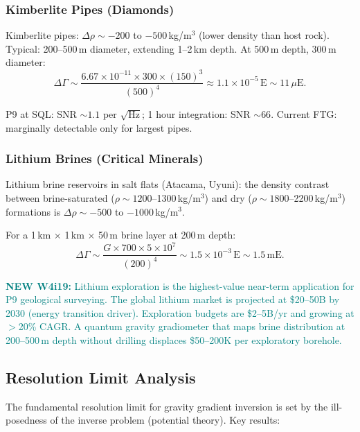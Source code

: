 \documentclass[11pt]{article}
\theoremstyle{definition}
\theoremstyle{remark}
\newcommand{\ee}[1]{\times10^{#1}}
\newcommand{\newfinding}[1]{\textcolor{teal}{\textbf{NEW W4i19:} #1}}
\begin{document}
\subsubsection{Kimberlite Pipes (Diamonds)}

Kimberlite pipes: $\Delta\rho \sim -200$ to $-500$\,kg/m$^3$ (lower density
than host rock). Typical: 200--500\,m diameter, extending 1--2\,km depth.
At 500\,m depth, 300\,m diameter:
\begin{equation}
  \Delta\Gamma \sim \frac{6.67\ee{-11} \times 300 \times (150)^3}{(500)^4}
  \approx 1.1\ee{-5}\,\text{E} \sim 11\,\mu\text{E}.
\end{equation}

P9 at SQL: SNR $\sim 1.1$ per $\sqrt{\text{Hz}}$; 1 hour integration: SNR $\sim 66$.
Current FTG: marginally detectable only for largest pipes.

\subsubsection{Lithium Brines (Critical Minerals)}

Lithium brine reservoirs in salt flats (Atacama, Uyuni): the density
contrast between brine-saturated ($\rho \sim 1200$--1300\,kg/m$^3$) and
dry ($\rho \sim 1800$--2200\,kg/m$^3$) formations is $\Delta\rho \sim
-500$ to $-1000$\,kg/m$^3$.

For a 1\,km $\times$ 1\,km $\times$ 50\,m brine layer at 200\,m depth:
\begin{equation}
  \Delta\Gamma \sim \frac{G \times 700 \times 5\ee{7}}{(200)^4}
  \sim 1.5\ee{-3}\,\text{E} \sim 1.5\,\text{mE}.
\end{equation}

\newfinding{Lithium exploration is the highest-value near-term application
for P9 geological surveying. The global lithium market is projected at
\$20--50B by 2030 (energy transition driver). Exploration budgets are
\$2--5B/yr and growing at $>$20\% CAGR. A quantum gravity gradiometer
that maps brine distribution at 200--500\,m depth without drilling
displaces \$50--200K per exploratory borehole.}

\subsection{Resolution Limit Analysis}

The fundamental resolution limit for gravity gradient inversion is set by
the ill-posedness of the inverse problem (potential theory). Key results:
\end{document}
